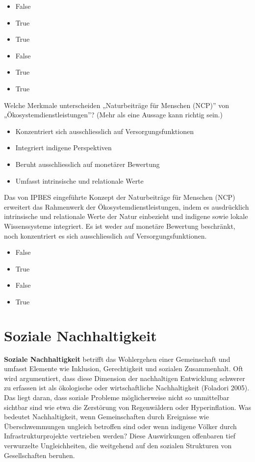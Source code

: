 \documentclass[
  nswissgerman,
  a4paper,
  DIV=11,
  numbers=noendperiod,
  oneside,
  openany]{scrreprt}
\providecommand{\tightlist}{%
  \setlength{\itemsep}{0pt}\setlength{\parskip}{0pt}}
\begin{document}
\begin{itemize}
\tightlist
\item
  False
\item
  True
\item
  True
\item
  False
\item
  True
\item
  True
\end{itemize}

Welche Merkmale unterscheiden „Naturbeiträge für Menschen (NCP)'' von
„Ökosystemdienstleistungen''? (Mehr als eine Aussage kann richtig sein.)

\begin{itemize}
\tightlist
\item[$\square$]
  Konzentriert sich ausschliesslich auf Versorgungsfunktionen
\item[$\square$]
  Integriert indigene Perspektiven
\item[$\square$]
  Beruht ausschliesslich auf monetärer Bewertung
\item[$\square$]
  Umfasst intrinsische und relationale Werte
\end{itemize}

Das von IPBES eingeführte Konzept der Naturbeiträge für Menschen (NCP)
erweitert das Rahmenwerk der Ökosystemdienstleistungen, indem es
ausdrücklich intrinsische und relationale Werte der Natur einbezieht und
indigene sowie lokale Wissenssysteme integriert. Es ist weder auf
monetäre Bewertung beschränkt, noch konzentriert es sich ausschliesslich
auf Versorgungsfunktionen.

\begin{itemize}
\tightlist
\item
  False
\item
  True
\item
  False
\item
  True
\end{itemize}

\chapter{Soziale Nachhaltigkeit}\label{soziale-nachhaltigkeit}

\textbf{Soziale Nachhaltigkeit} betrifft das Wohlergehen einer
Gemeinschaft und umfasst Elemente wie Inklusion, Gerechtigkeit und
sozialen Zusammenhalt. Oft wird argumentiert, dass diese Dimension der
nachhaltigen Entwicklung schwerer zu erfassen ist als ökologische oder
wirtschaftliche Nachhaltigkeit (Foladori 2005). Das liegt daran, dass
soziale Probleme möglicherweise nicht so unmittelbar sichtbar sind wie
etwa die Zerstörung von Regenwäldern oder Hyperinflation. Was bedeutet
Nachhaltigkeit, wenn Gemeinschaften durch Ereignisse wie
Überschwemmungen ungleich betroffen sind oder wenn indigene Völker durch
Infrastrukturprojekte vertrieben werden? Diese Auswirkungen offenbaren
tief verwurzelte Ungleichheiten, die weitgehend auf den sozialen
Strukturen von Gesellschaften beruhen.
\end{document}
